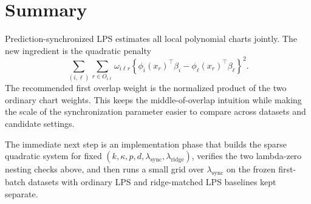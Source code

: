 \documentclass[11pt]{article}
\begin{document}
\section{Summary}

Prediction-synchronized LPS estimates all local polynomial charts jointly.  The
new ingredient is the quadratic penalty
\[
  \sum_{(i,\ell)}
  \sum_{r\in O_{i\ell}}
  \omega_{i\ell r}
  \left\{
    \phi_i(x_r)^\top\beta_i
    -
    \phi_\ell(x_r)^\top\beta_\ell
  \right\}^2.
\]
The recommended first overlap weight is the normalized product of the two
ordinary chart weights.  This keeps the middle-of-overlap intuition while
making the scale of the synchronization parameter easier to compare across
datasets and candidate settings.

The immediate next step is an implementation phase that builds the sparse
quadratic system for fixed
\((k,\kappa,p,d,\lambda_{\mathrm{sync}},\lambda_{\mathrm{ridge}})\), verifies
the two lambda-zero nesting checks above, and then runs a small grid over
\(\lambda_{\mathrm{sync}}\) on the frozen first-batch datasets with ordinary
LPS and ridge-matched LPS baselines kept separate.
\end{document}
